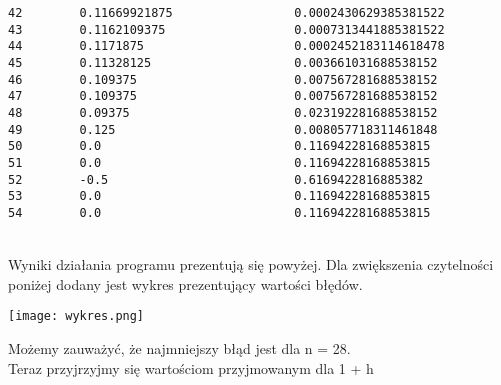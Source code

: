 \documentclass{article}
\begin{document}
\begin{verbatim}
42        0.11669921875                 0.0002430629385381522
43        0.1162109375                  0.0007313441885381522
44        0.1171875                     0.0002452183114618478
45        0.11328125                    0.003661031688538152
46        0.109375                      0.007567281688538152
47        0.109375                      0.007567281688538152
48        0.09375                       0.023192281688538152
49        0.125                         0.008057718311461848
50        0.0                           0.11694228168853815
51        0.0                           0.11694228168853815
52        -0.5                          0.6169422816885382
53        0.0                           0.11694228168853815
54        0.0                           0.11694228168853815
\end{verbatim}

\noindent \\ Wyniki działania programu prezentują się powyżej. Dla zwiększenia czytelności poniżej dodany jest wykres prezentujący wartości błędów.
\begin{center}
    \texttt{[image: wykres.png]}
\end{center}
\noindent Możemy zauważyć, że najmniejszy błąd jest dla n = 28.\\
\noindent Teraz przyjrzyjmy się wartościom przyjmowanym dla 1 + h
\end{document}
